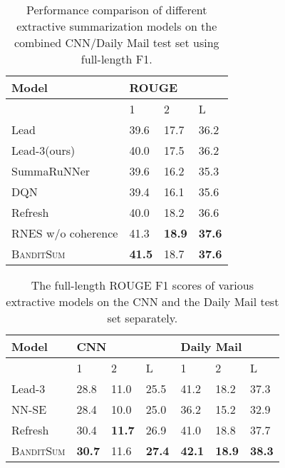 \documentclass[11pt,a4paper]{article}
\newcommand{\B}{\textsc{BanditSum }}
\begin{document}
\begin{table}[!h]
\footnotesize
\centering
\begin{tabular}{|l|l|l|l|}
\hline
Model & \multicolumn{3}{l|}{ROUGE} \\ 
\hline
 & 1 & 2 & L \\ 
 \hline
Lead\citep{DBLP:Narayan/2018} & 39.6 & 17.7 & 36.2 \\ 
Lead-3(ours) & 40.0 & 17.5 & 36.2 \\
SummaRuNNer & 39.6 & 16.2 & 35.3  \\
DQN & 39.4	& 16.1 &	35.6 \\ 
Refresh & 40.0 &18.2 &36.6\\
RNES w/o coherence & 41.3 & \textbf{18.9} & \textbf{37.6}\\ 
\hline
\B  & \textbf{41.5} & 18.7 & \textbf{37.6} \\ 
\hline
\end{tabular}
\caption{Performance comparison of different extractive summarization models on the combined CNN/Daily Mail test set using full-length F1. }
\label{table:results_cnn}
\end{table}

\begin{table}[!h]
\small
\centering
\setlength\tabcolsep{4 pt}
\begin{tabular}{|l|l|l|l|l|l|l|}
\hline
Model & \multicolumn{3}{l|}{CNN} & \multicolumn{3}{l|}{Daily Mail} \\ \hline
 & 1 & 2 & L & 1 & 2 & L   \\ \hline
Lead-3 & 28.8 & 11.0 & 25.5 & 41.2 & 18.2 & 37.3 \\
NN-SE & 28.4 & 10.0 & 25.0 & 36.2 & 15.2 & 32.9 \\
Refresh & 30.4 & \textbf{11.7} & 26.9& 41.0 & 18.8 & 37.7 \\ 
\B & \textbf{30.7} & 11.6 & \textbf{27.4} & \textbf{42.1} & \textbf{18.9} &  \textbf{38.3}\\  
\hline
\end{tabular}
\caption{The full-length ROUGE F1 scores of various extractive models on the CNN and the Daily Mail test set separately.}
\label{table:daily_mail}
\end{table}
\end{document}
